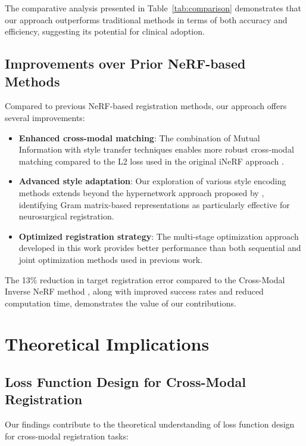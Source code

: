 The comparative analysis presented in Table~\ref{tab:comparison} demonstrates that our approach outperforms traditional methods in terms of both accuracy and efficiency, suggesting its potential for clinical adoption.

\subsection{Improvements over Prior NeRF-based Methods}

Compared to previous NeRF-based registration methods, our approach offers several improvements:

\begin{itemize}
    \item \textbf{Enhanced cross-modal matching}: The combination of Mutual Information with style transfer techniques enables more robust cross-modal matching compared to the L2 loss used in the original iNeRF approach \parencite{yen2020inerf}.
    
    \item \textbf{Advanced style adaptation}: Our exploration of various style encoding methods extends beyond the hypernetwork approach proposed by \textcite{fehrentz2024intraoperative}, identifying Gram matrix-based representations as particularly effective for neurosurgical registration.
    
    \item \textbf{Optimized registration strategy}: The multi-stage optimization approach developed in this work provides better performance than both sequential and joint optimization methods used in previous work.
\end{itemize}

The 13\% reduction in target registration error compared to the Cross-Modal Inverse NeRF method \parencite{fehrentz2024intraoperative}, along with improved success rates and reduced computation time, demonstrates the value of our contributions.

\section{Theoretical Implications}

\subsection{Loss Function Design for Cross-Modal Registration}

Our findings contribute to the theoretical understanding of loss function design for cross-modal registration tasks:

